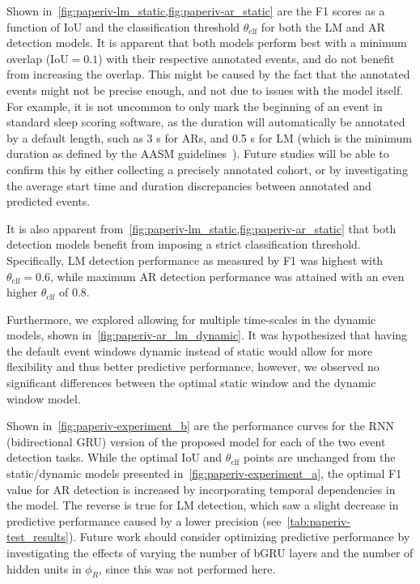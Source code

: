 Shown in~\cref{fig:paperiv-lm_static,fig:paperiv-ar_static} are the F1 scores as a function of IoU and the classification threshold $\theta_{\mathrm{clf}}$ for both the LM and AR detection models. It is apparent that both models perform best with a minimum overlap ($\mathrm{IoU} = 0.1$) with their respective annotated events, and do not benefit from increasing the overlap. This might be caused by the fact that the annotated events might not be precise enough, and not due to issues with the model itself. For example, it is not uncommon to only mark the beginning of an event in standard sleep scoring software, as the duration will automatically be annotated by a default length, such as 3 s for ARs, and 0.5 s for LM (which is the minimum duration as defined by the \ac{AASM} guidelines~\cite{Berry2018a}). Future studies will be able to confirm this by either collecting a precisely annotated cohort, or by investigating the average start time and duration discrepancies between annotated and predicted events. 

It is also apparent from~\cref{fig:paperiv-lm_static,fig:paperiv-ar_static} that both detection models benefit from imposing a strict classification threshold. Specifically, LM detection performance as measured by F1 was highest with $\theta_{\mathrm{clf}} = 0.6$, while maximum AR detection performance was attained with an even higher $\theta_{\mathrm{clf}}$ of 0.8.

Furthermore, we explored allowing for multiple time-scales in the dynamic models, shown in~\cref{fig:paperiv-ar_lm_dynamic}. It was hypothesized that having the default event windows dynamic instead of static would allow for more flexibility and thus better predictive performance, however, we observed no significant differences between the optimal static window and the dynamic window model.

Shown in~\cref{fig:paperiv-experiment_b} are the performance curves for the RNN (bidirectional GRU) version of the proposed model for each of the two event detection tasks. While the optimal IoU and $\theta_{\mathrm{clf}}$ points are unchanged from the static/dynamic models presented in~\cref{fig:paperiv-experiment_a}, the optimal F1 value for AR detection is increased by incorporating temporal dependencies in the model. The reverse is true for LM detection, which saw a slight decrease in predictive performance caused by a lower precision (see~\cref{tab:paperiv-test_results}). Future work should consider optimizing predictive performance by investigating the effects of varying the number of bGRU layers and the number of hidden units in $\phi_{R}$, since this was not performed here.

